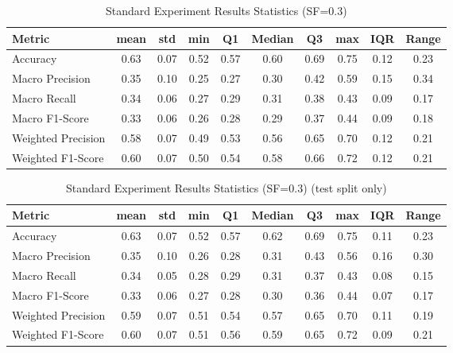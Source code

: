 \begin{table}[h]
\caption{Standard Experiment Results Statistics (SF=$0.3$)}
\label{tab:sf0.3_Standard_Results_Statistics}
\begin{tabular}{|l|c|c|c|c|c|c|c|c|c|}
\toprule
Metric & mean & std & min & Q1 & Median & Q3 & max & IQR & Range \\
\midrule
Accuracy & 0.63 & 0.07 & 0.52 & 0.57 & 0.60 & 0.69 & 0.75 & 0.12 & 0.23 \\
Macro Precision & 0.35 & 0.10 & 0.25 & 0.27 & 0.30 & 0.42 & 0.59 & 0.15 & 0.34 \\
Macro Recall & 0.34 & 0.06 & 0.27 & 0.29 & 0.31 & 0.38 & 0.43 & 0.09 & 0.17 \\
Macro F1-Score & 0.33 & 0.06 & 0.26 & 0.28 & 0.29 & 0.37 & 0.44 & 0.09 & 0.18 \\
Weighted Precision & 0.58 & 0.07 & 0.49 & 0.53 & 0.56 & 0.65 & 0.70 & 0.12 & 0.21 \\
Weighted F1-Score & 0.60 & 0.07 & 0.50 & 0.54 & 0.58 & 0.66 & 0.72 & 0.12 & 0.21 \\
\bottomrule
\end{tabular}
\end{table}

\begin{table}[h]
\caption{Standard Experiment Results Statistics (SF=$0.3$) (test split only)}
\label{tab:sf0.3_test_Standard_Results_Statistics}
\begin{tabular}{|l|c|c|c|c|c|c|c|c|c|}
\toprule
Metric & mean & std & min & Q1 & Median & Q3 & max & IQR & Range \\
\midrule
Accuracy & 0.63 & 0.07 & 0.52 & 0.57 & 0.62 & 0.69 & 0.75 & 0.11 & 0.23 \\
Macro Precision & 0.35 & 0.10 & 0.26 & 0.28 & 0.31 & 0.43 & 0.56 & 0.16 & 0.30 \\
Macro Recall & 0.34 & 0.05 & 0.28 & 0.29 & 0.31 & 0.37 & 0.43 & 0.08 & 0.15 \\
Macro F1-Score & 0.33 & 0.06 & 0.27 & 0.28 & 0.30 & 0.36 & 0.44 & 0.07 & 0.17 \\
Weighted Precision & 0.59 & 0.07 & 0.51 & 0.54 & 0.57 & 0.65 & 0.70 & 0.11 & 0.19 \\
Weighted F1-Score & 0.60 & 0.07 & 0.51 & 0.56 & 0.59 & 0.65 & 0.72 & 0.09 & 0.21 \\
\bottomrule
\end{tabular}
\end{table}

